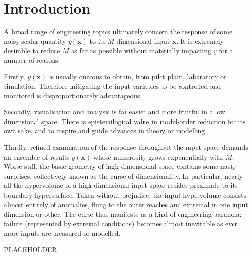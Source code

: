\documentclass[preprint,12pt]{elsarticle}
\newcommand*{\M}[1]{\ensuremath{#1}\xspace}
\newcommand*{\vr}[1]{\M{\mathbf{#1}}}
\begin{document}

    \section{Introduction} \label{sec:Intro}
        A broad range of engineering topics ultimately concern the response of some noisy scalar quantity $y(\vr{x})$ to its \M{M}-dimensional input $\vr{x}$. It is extremely desirable to reduce \M{M} as far as possible without materially impacting \M{y} for a number of reasons. 
        
        Firstly, $y(\vr{x})$ is usually onerous to obtain, from pilot plant, laboratory or simulation. Therefore mitigating the input variables to be controlled and monitored is disproportionately advantageous.
        
        Secondly, visualisation and analysis is far easier and more fruitful in a low dimensional space.
        There is epistemilogical value in model-order reduction for its own sake, and to inspire and guide advances in theory or modelling.
        
        Thirdly, refined examination of the response throughout the input space demands an ensemble of results $y(\vr{x})$ whose numerosity grows exponentially with \M{M}. Worse still, the basic geometry of high-dimensional space contains some nasty surprises, collectively known as the curse of dimensionality. In particular, nearly all the hypervolume of a high-dimensional input space resides proximate to its boundary hypersurface. Taken without prejudice, the input hypervolume consists almost entirely of anomalies, flung to the outer reaches and extremal in one input dimension or other. The curse thus manifests as a kind of engineering paranoia: failure (represented by extremal conditions) becomes almost inevitable as ever more inputs are measured or modelled.

PLACEHOLDER
\end{document}
